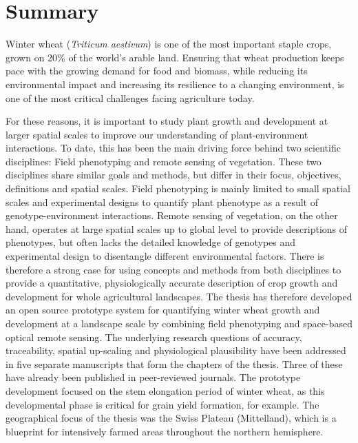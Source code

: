 \chapter*{Summary}

Winter wheat (\textsl{Triticum aestivum}) is one of the most important staple crops, grown on 20\% of the world's arable land. Ensuring that wheat production keeps pace with the growing demand for food and biomass, while reducing its environmental impact and increasing its resilience to a changing environment, is one of the most critical challenges facing agriculture today.

For these reasons, it is important to study plant growth and development at larger spatial scales to improve our understanding of plant-environment interactions. To date, this has been the main driving force behind two scientific disciplines: Field phenotyping and remote sensing of vegetation. These two disciplines share similar goals and methods, but differ in their focus, objectives, definitions and spatial scales. Field phenotyping is mainly limited to small spatial scales and experimental designs to quantify plant phenotype as a result of genotype-environment interactions. Remote sensing of vegetation, on the other hand, operates at large spatial scales up to global level to provide descriptions of phenotypes, but often lacks the detailed knowledge of genotypes and experimental design to disentangle different environmental factors. There is therefore a strong case for using concepts and methods from both disciplines to provide a quantitative, physiologically accurate description of crop growth and development for whole agricultural landscapes.
The thesis has therefore developed an open source prototype system for quantifying winter wheat growth and development at a landscape scale by combining field phenotyping and space-based optical remote sensing. The underlying research questions of accuracy, traceability, spatial up-scaling and physiological plausibility have been addressed in five separate manuscripts that form the chapters of the thesis. Three of these have already been published in peer-reviewed journals. The prototype development focused on the stem elongation period of winter wheat, as this developmental phase is critical for grain yield formation, for example. The geographical focus of the thesis was the Swiss Plateau (Mittelland), which is a blueprint for intensively farmed areas throughout the northern hemisphere.

